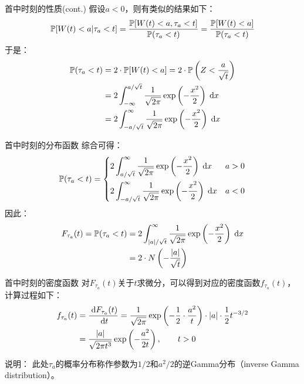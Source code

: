 \documentclass[t]{beamer}
\newcommand{\dif}{{\;\rm d}}
\renewcommand{\Pr}{\mathbb{P}}
\begin{document}
\begin{frame}{首中时刻的性质(cont.)}
  假设$a<0$，则有类似的结果如下：
\begin{equation*}
\Pr\qty[W(t)<a|\tau_a<t]=\frac{\Pr\qty[W(t)<a, \tau_a<t]}{\Pr(\tau_a<t)}=\frac{\Pr\qty[W(t)<a]}{\Pr(\tau_a<t)}
\end{equation*}
于是：
\begin{equation*}
\begin{split}
\Pr(\tau_a<t)&= 2\cdot \Pr[W(t)<a]=2\cdot \Pr\left(Z<\frac{a}{\sqrt{t}}\right)\\
&=2\int_{-\infty}^{a/\sqrt{t}} \frac{1}{\sqrt{2\pi }}\exp\left(-\frac{x^2}{2}\right)\dif x\\
&=2\int_{-a/\sqrt{t}}^{\infty} \frac{1}{\sqrt{2\pi }}\exp\left(-\frac{x^2}{2}\right)\dif x\\
\end{split}
\end{equation*}
\end{frame}


\begin{frame}{首中时刻的分布函数}
    综合可得：
\[\Pr(\tau_a<t)=\begin{cases}
  \vspace{1ex}  2\displaystyle\int_{a/\sqrt{t}}^{\infty} \frac{1}{\sqrt{2\pi }}\exp\left(-\frac{x^2}{2}\right)\dif x& a>0\\
2\displaystyle\int_{-a/\sqrt{t}}^{\infty} \frac{1}{\sqrt{2\pi }}\exp\left(-\frac{x^2}{2}\right)\dif x&a<0
\end{cases}\]
因此：\begin{equation*}
	\begin{split}
		F_{\tau_a}(t)=\Pr(\tau_a<t)&=2\int_{|a|/\sqrt{t}}^{\infty} \frac{1}{\sqrt{2\pi }}\exp\left(-\frac{x^2}{2}\right)\dif x\\
		&=2\cdot N\left(-\frac{|a|}{\sqrt{t}}\right)	
	\end{split}
\end{equation*}
\end{frame}


\begin{frame}{首中时刻的密度函数}
  对$F_{\tau_a}(t)$关于$t$求微分，可以得到对应的密度函数$f_{\tau_a}(t)$，计算过程如下：
  \begin{equation*}
  \begin{split}
  f_{\tau_a}(t)&=\frac{\dif F_{\tau_a}(t)}{\dif t}
  =\frac{1}{\sqrt{2\pi}}\exp\left(-\frac{1}{2}\cdot \frac{a^2}{t}\right)\cdot |a|\cdot \frac{1}{2}t^{-3/2}\\
  &=\frac{|a|}{\sqrt{2\pi t^3}}\exp\left(-\frac{a^2}{2t}\right), \qquad t>0 
  \end{split}
  \end{equation*}

  \begin{block}{说明：}
    此处$\tau_a$的概率分布称作参数为$1/2$和$a^2/2$的逆Gamma分布（inverse Gamma distribution）。
  \end{block}
\end{frame}
\end{document}
